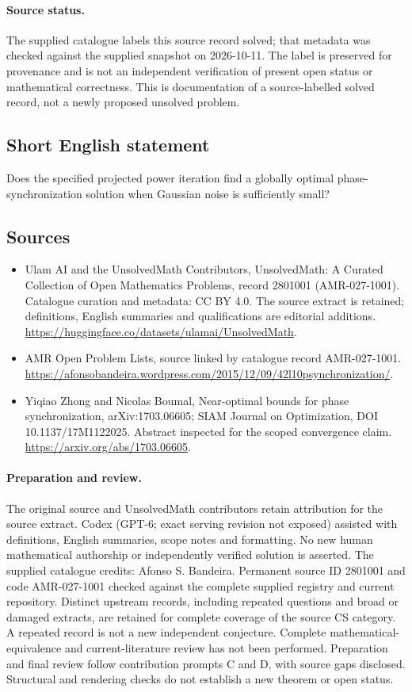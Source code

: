 \documentclass[11pt]{article}
\begin{document}
\paragraph{Source status.}
The supplied catalogue labels this source record solved; that metadata was checked against the supplied snapshot on 2026-10-11. The label is preserved for provenance and is not an independent verification of present open status or mathematical correctness. This is documentation of a source-labelled solved record, not a newly proposed unsolved problem.
\subsection{Short English statement}
Does the specified projected power iteration find a globally optimal phase-synchronization solution when Gaussian noise is sufficiently small?
\subsection{Sources}
\begin{itemize}
\item[\hypertarget{source:2801001:1}{S1}] Ulam AI and the UnsolvedMath Contributors, UnsolvedMath: A Curated Collection of Open Mathematics Problems, record 2801001 (AMR-027-1001). Catalogue curation and metadata: CC BY 4.0. The source extract is retained; definitions, English summaries and qualifications are editorial additions.
\url{https://huggingface.co/datasets/ulamai/UnsolvedMath}.
\item[\hypertarget{source:2801001:2}{S2}] AMR Open Problem Lists, source linked by catalogue record AMR-027-1001.
\url{https://afonsobandeira.wordpress.com/2015/12/09/42l10psynchronization/}.
\item[\hypertarget{source:2801001:3}{S3}] Yiqiao Zhong and Nicolas Boumal, Near-optimal bounds for phase synchronization, arXiv:1703.06605; SIAM Journal on Optimization, DOI 10.1137/17M1122025. Abstract inspected for the scoped convergence claim.
\url{https://arxiv.org/abs/1703.06605}.
\end{itemize}
\paragraph{Preparation and review.}
The original source and UnsolvedMath contributors retain attribution for the source extract. Codex (GPT-6; exact serving revision not exposed) assisted with definitions, English summaries, scope notes and formatting. No new human mathematical authorship or independently verified solution is asserted. The supplied catalogue credits: Afonso S. Bandeira. Permanent source ID 2801001 and code AMR-027-1001 checked against the complete supplied registry and current repository. Distinct upstream records, including repeated questions and broad or damaged extracts, are retained for complete coverage of the source CS category. A repeated record is not a new independent conjecture. Complete mathematical-equivalence and current-literature review has not been performed. Preparation and final review follow contribution prompts C and D, with source gaps disclosed. Structural and rendering checks do not establish a new theorem or open status.
\label{end:2801001}
\end{document}
